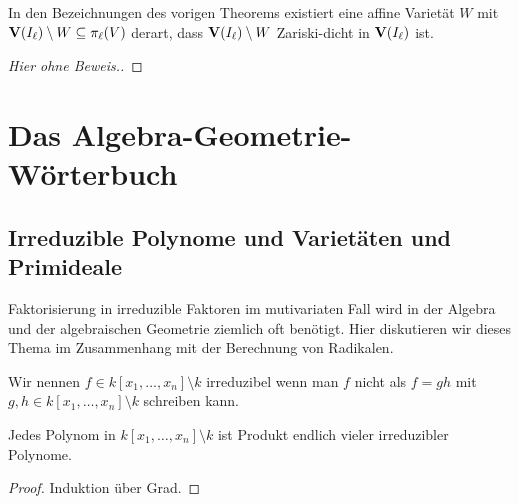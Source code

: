 \documentclass[11pt]{article}
\numberwithin{equation}{section}
\begin{document}
\begin{theorem} 
	In den Bezeichnungen des vorigen Theorems existiert eine affine Varietät $W$ mit $\mathbf{V}(I_\ell) \setminus W \subseteq \pi_\ell(V)$ derart, dass $\mathbf{V}(I_\ell) \setminus W$ Zariski-dicht in $\mathbf{V}(I_\ell)$ ist. 
\end{theorem} 
\begin{proof}[Hier ohne Beweis.]
\end{proof} 

\section{Das Algebra-Geometrie-Wörterbuch}



\subsection{Irreduzible Polynome und Varietäten und Primideale} 

Faktorisierung in irreduzible Faktoren im mutivariaten Fall wird in der Algebra und der algebraischen Geometrie ziemlich oft benötigt. Hier diskutieren wir dieses Thema im Zusammenhang mit der Berechnung von Radikalen. 

\begin{definition} 
	Wir nennen $f \in k[x_1,\ldots,x_n] \setminus k$ irreduzibel wenn man $f$ nicht als $f = gh$ mit $g,h \in k[x_1,\ldots,x_n] \setminus k$ schreiben kann. 
\end{definition} 

\begin{proposition} 
	Jedes Polynom in $k[x_1,\ldots,x_n] \setminus k$ ist Produkt endlich vieler irreduzibler Polynome. 
\end{proposition} 
\begin{proof} 
	Induktion über Grad. 
\end{proof} 
\end{document}
